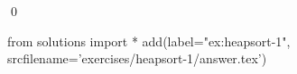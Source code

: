 
\begin{ex} 
  \label{ex:heapsort-1}
  
  \qed
\end{ex} 
\begin{python0}
from solutions import *
add(label="ex:heapsort-1",
    srcfilename='exercises/heapsort-1/answer.tex') 
\end{python0}
